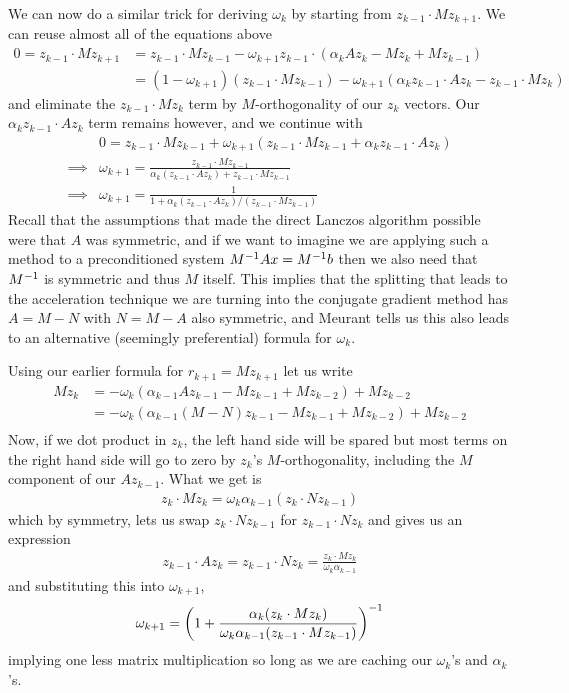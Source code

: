 \documentclass[11pt]{article}
\begin{document}
We can now do a similar trick for deriving $\omega_k$ by starting from $z_{k-1} \cdot M z_{k+1}$. We can reuse almost all of the equations above \begin{align*}
0 = z_{k-1} \cdot M z_{k+1} &= z_{k-1} \cdot Mz_{k-1} - \omega_{k+1} z_{k-1} \cdot (\alpha_k A z_k - Mz_k + Mz_{k-1}) \\
&= (1 - \omega_{k+1})(z_{k-1} \cdot Mz_{k-1}) - \omega_{k+1} (\alpha_k z_{k-1} \cdot A z_k - z_{k-1} \cdot Mz_k)
\end{align*}
and eliminate the $z_{k-1} \cdot M z_k$ term by $M$-orthogonality of our $z_k$ vectors. Our $\alpha_k z_{k-1} \cdot A z_k$ term remains however, and we continue with \begin{align*}
& 0 = z_{k-1} \cdot Mz_{k-1} + \omega_{k+1}(z_{k-1} \cdot Mz_{k-1} + \alpha_k z_{k-1} \cdot A z_k) \\
\implies &\omega_{k+1} = \frac{z_{k-1} \cdot M z_{k-1}}{ \alpha_k (z_{k-1} \cdot A z_k) + z_{k-1} \cdot M z_{k-1} } \\
\implies & \omega_{k+1} = \frac{1}{1 + \alpha_k (z_{k-1} \cdot A z_k) / (z_{k-1} \cdot M z_{k-1})}
\end{align*}
Recall that the assumptions that made the direct Lanczos algorithm possible were that $A$ was symmetric, and if we want to imagine we are applying such a method to a preconditioned system $M^{-1} A x = M^{-1} b$ then we also need that $M^{-1}$ is symmetric and thus $M$ itself. This implies that the splitting that leads to the acceleration technique we are turning into the conjugate gradient method has $A = M - N$ with $N = M - A$ also symmetric, and Meurant tells us this also leads to an alternative (seemingly preferential) formula for $\omega_k$.

Using our earlier formula for $r_{k+1} = Mz_{k+1}$ let us write \begin{align*}
Mz_{k} &= - \omega_{k}(\alpha_{k-1} A z_{k-1} - Mz_{k-1} + Mz_{k-2}) + Mz_{k-2} \\
 &= - \omega_{k}(\alpha_{k-1} (M - N) z_{k-1} - Mz_{k-1} + Mz_{k-2}) + Mz_{k-2} \\
\end{align*}
Now, if we dot product in $z_k$, the left hand side will be spared but most terms on the right hand side will go to zero by $z_k$'s $M$-orthogonality, including the $M$ component of our $A z_{k-1}$. What we get is 
\begin{gather*}
z_k \cdot Mz_{k} = \omega_{k}\alpha_{k-1} (z_k \cdot N z_{k-1})
\end{gather*}
which by symmetry, lets us swap $z_k \cdot N z_{k-1}$ for $z_{k-1} \cdot N z_{k}$ and gives us an expression \begin{gather*}
z_{k-1} \cdot A z_{k} = z_{k-1} \cdot N z_{k} = \frac{z_{k} \cdot M z_{k}}{\omega_k \alpha_{k-1}}
\end{gather*}
and substituting this into $\omega_{k+1}$, \begin{gather*}
\omega_{k+1} = \left( 1 + \frac{\alpha_k (z_k \cdot M z_k )}{\omega_k \alpha_{k-1}(z_{k-1} \cdot M z_{k-1})}\right)^{-1}
\end{gather*}
implying one less matrix multiplication so long as we are caching our $\omega_k$'s and $\alpha_k$'s.
\end{document}
